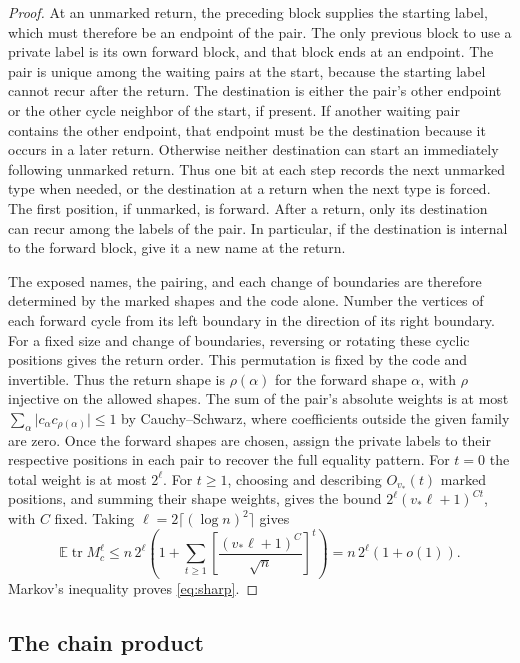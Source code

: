 \documentclass[preprints,article,submit,oneauthor]{Definitions/mdpi}
\newcommand{\E}{\mathbb E}
\newcommand{\tr}{\operatorname{tr}}
\newcommand{\abs}[1]{\lvert #1\rvert}
\begin{document}
\begin{proof}
At an unmarked return, the preceding block supplies the starting
label, which must therefore be an endpoint of the pair. The only
previous block to use a private label is its own forward block, and
that block ends at an endpoint. The pair is unique among the waiting
pairs at the start, because the starting label cannot recur after
the return.
The destination is either the pair's other endpoint or the other
cycle neighbor of the start, if present. If another waiting pair
contains the other endpoint, that endpoint must be the destination
because it occurs in a later return. Otherwise neither destination
can start an immediately following unmarked return. Thus one bit at
each step records the next unmarked type when needed, or the
destination at a return when the next type is forced. The first
position, if unmarked, is forward. After a return, only its
destination can recur among the labels of the pair. In particular,
if the destination is internal to the forward block, give it a new
name at the return.

The exposed names, the pairing, and each change of boundaries are
therefore determined by the marked shapes and the code alone. Number
the vertices of each forward cycle from its left boundary in the
direction of its right boundary. For a fixed size and change of
boundaries, reversing or rotating these cyclic positions gives the
return order. This permutation is fixed by the code and invertible.
Thus the return shape is \(\rho(\alpha)\) for the forward shape
\(\alpha\), with \(\rho\) injective on the allowed shapes. The sum of
the pair's absolute weights is at most
\(\sum_\alpha\abs{c_\alpha c_{\rho(\alpha)}}\le1\) by Cauchy--Schwarz,
where coefficients outside the given family are zero. Once the
forward shapes are chosen, assign the private labels to their
respective positions in each pair to recover the full equality
pattern. For \(t=0\) the total weight is at most
\(2^\ell\). For \(t\ge1\), choosing and describing \(O_{v_\ast}(t)\) marked
positions, and summing their shape weights, gives the bound
\(2^\ell(v_\ast\ell+1)^{C t}\), with \(C\) fixed. Taking
\(\ell=2\lceil(\log n)^2\rceil\) gives
\[
 \E\tr M_c^\ell\le n\,2^\ell
    \left(1+\sum_{t\ge1}\left[\frac{(v_\ast\ell+1)^C}{\sqrt n}\right]^t\right)
    =n\,2^\ell(1+o(1)).
\]
Markov's inequality proves \eqref{eq:sharp}.
\end{proof}

\subsection{The chain product}
\end{document}
